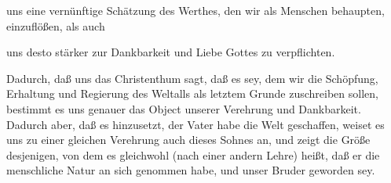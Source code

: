 \begin{aufza}
\begin{aufzb}
\item uns eine vernünftige Schätzung des Werthes, den wir als Menschen behaupten, einzuflößen, als auch
\item uns desto stärker zur Dankbarkeit und Liebe Gottes zu verpflichten.~
\end{aufzb}
\item Dadurch, daß uns das Christenthum sagt, daß es  sey, dem wir die Schöpfung, Erhaltung und Regierung des Weltalls als letztem Grunde zuschreiben sollen, bestimmt es uns genauer das Object unserer Verehrung und Dankbarkeit. Dadurch aber, daß es hinzusetzt, der Vater habe die Welt  geschaffen, weiset es uns zu einer gleichen Verehrung auch dieses Sohnes an, und zeigt die Größe desjenigen, von dem es gleichwohl (nach einer andern Lehre) heißt, daß er die menschliche Natur an sich genommen habe, und unser Bruder geworden sey.
\end{aufza}


